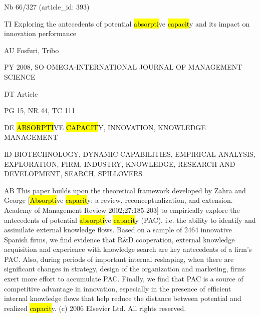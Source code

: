 \documentclass[a4paper]{article}
\begin{document}
\vspace*{-2cm}
Nb \tabto{0cm}66/327 (article\_id: 393)\par
TI \tabto{0cm}Exploring the antecedents of potential \hl{absorpti}ve \hl{capacit}y and its impact on innovation performance\par
AU \tabto{0cm}Fosfuri, Tribo\par
PY \tabto{0cm}2008, SO OMEGA-INTERNATIONAL JOURNAL OF MANAGEMENT SCIENCE\par
DT \tabto{0cm}Article\par
PG \tabto{0cm}15, NR 44, TC 111\par
DE \tabto{0cm}\hl{ABSORPTI}VE \hl{CAPACIT}Y, INNOVATION, KNOWLEDGE MANAGEMENT\par
ID \tabto{0cm}BIOTECHNOLOGY, DYNAMIC CAPABILITIES, EMPIRICAL-ANALYSIS, EXPLORATION, FIRM, INDUSTRY, KNOWLEDGE, RESEARCH-AND-DEVELOPMENT, SEARCH, SPILLOVERS\par
AB \tabto{0cm}This paper builds upon the theoretical framework developed by Zahra and George [\hl{Absorpti}ve \hl{capacit}y: a review, reconceptualization, and extension. Academy of Management Review 2002;27:185-203] to empirically explore the antecedents of potential \hl{absorpti}ve \hl{capacit}y (PAC), i.e. the ability to identify and assimilate external knowledge flows. Based on a sample of 2464 innovative Spanish firms, we find evidence that R\&D cooperation, external knowledge acquisition and experience with knowledge search are key antecedents of a firm's PAC. Also, during periods of important internal reshaping, when there are significant changes in strategy, design of the organization and marketing, firms exert more effort to accumulate PAC. Finally, we find that PAC is a source of competitive advantage in innovation, especially in the presence of efficient internal knowledge flows that help reduce the distance between potential and realized \hl{capacit}y. (c) 2006 Elsevier Ltd. All rights reserved.\par
\clearpage
\end{document}
